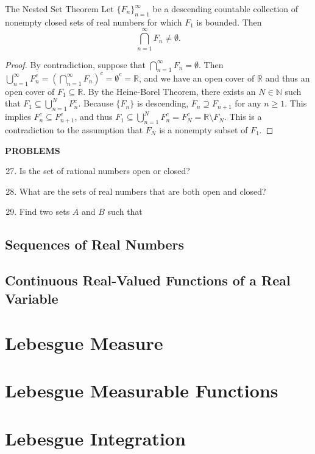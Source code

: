 \documentclass[a4paper,10pt]{book}
\theoremstyle{plain} %
\newcommand{\thistheoremname}{}
\newtheorem*{genericthm*}{\thistheoremname}
\newenvironment{namedthm*}[1]
	{\renewcommand{\thistheoremname}{#1}%
	\begin{genericthm*}}
	{\end{genericthm*}}
\begin{document}
\begin{namedthm*}{The Nested Set Theorem}
Let $\{F_n\}_{n=1}^\infty$ be a descending countable collection of nonempty closed sets of real numbers for which $F_1$ is bounded.
Then
\[
    \bigcap_{n=1}^\infty F_n \neq \emptyset.
\]
\end{namedthm*}
\begin{proof} 
By contradiction, suppose that $\bigcap_{n=1}^\infty F_n = \emptyset$. 
Then $\bigcup_{n=1}^\infty F_n^c = (\bigcap_{n=1}^\infty F_n)^c  = \emptyset^c = \mathbb{R}$, and we have an open cover of $\mathbb{R}$ and thus an open cover of $F_1 \subseteq \mathbb{R}$. 
By the Heine-Borel Theorem, there exists an $N \in \mathbb {N}$ such that $F_1 \subseteq \bigcup_{n=1}^N F_n^c$.  
Because $\{F_n\}$ is descending, $F_n \supseteq F_{n+1}$ for any $n \ge 1$. 
This implies $F_{n}^c \subseteq F_{n+1}^c$, and thus $F_1 \subseteq \bigcup_{n=1}^N F_n^c = F_N^c = \mathbb{R}\setminus F_N$.
This is a contradiction to the assumption that $F_N$ is a nonempty subset of $F_1$.
\end{proof}

\begin{center}
	\textbf{PROBLEMS}
\end{center}
\begin{enumerate}
	\setcounter{enumi}{26}
	\item Is the set of rational numbers open or closed?
	\item What are the sets of real numbers that are both open and closed?
	\item Find two sets $A$ and $B$ such that 
\end{enumerate}

\section{Sequences of Real Numbers}
\section{Continuous Real-Valued Functions of a Real Variable}

\chapter{Lebesgue Measure}
\chapter{Lebesgue Measurable Functions}
\chapter{Lebesgue Integration}
\end{document}
